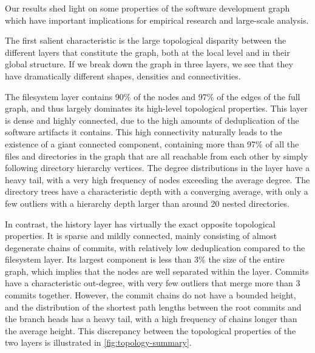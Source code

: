 Our results shed light on some properties of the software development graph
which have important implications for empirical research and large-scale
analysis.

The first salient characteristic is the large topological disparity between the
different layers that constitute the graph, both at the local level and in
their global structure. If we break down the graph in three layers, we see that
they have dramatically different shapes, densities and connectivities.

The filesystem layer contains 90\% of the nodes and 97\% of the edges of the
full graph, and thus largely dominates its high-level topological properties.
This layer is dense and highly connected, due to the high amounts of
deduplication of the software artifacts it contains. This high connectivity
naturally leads to the existence of a giant connected component, containing
more than 97\% of all the files and directories in the graph that are all
reachable from each other by simply following directory hierarchy vertices.
The degree distributions in the layer have a heavy tail, with a very high
frequency of nodes exceeding the average degree.
The directory trees have a characteristic depth with a converging average, with
only a few outliers with a hierarchy depth larger than around 20 nested
directories.

In contrast, the history layer has virtually the exact opposite topological
properties. It is sparse and mildly connected, mainly consisting of almost
degenerate chains of commits, with relatively low deduplication compared to the
filesystem layer. Its largest component is less than 3\% the size of the entire
graph, which implies that the nodes are well separated within the layer.
Commits have a characteristic out-degree, with very few outliers that merge
more than 3 commits together. However, the commit chains do not have a bounded
height, and the distribution of the shortest path lengths between the root
commits and the branch heads has a heavy tail, with a high frequency of chains
longer than the average height. This discrepancy between the topological
properties of the two layers is illustrated in \cref{fig:topology-summary}.

